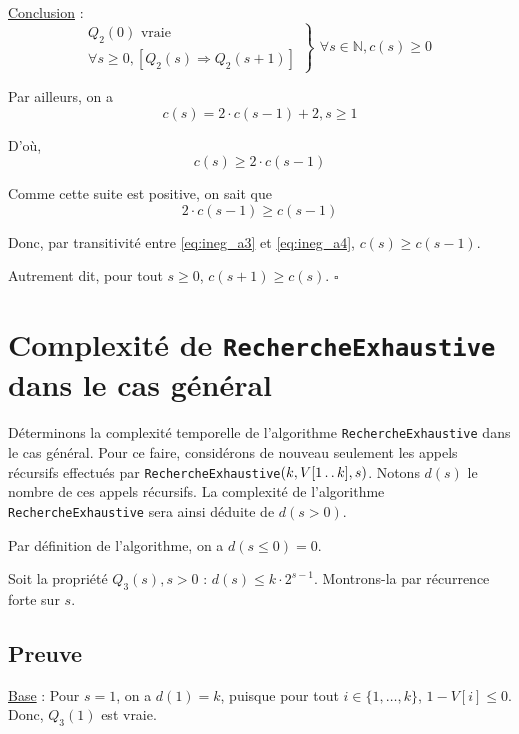 \documentclass[12pt,a4paper]{article}
\newcommand{\tdots}{\mathinner {\ldotp \ldotp}}
\begin{document}
\begin{appendices}
\medskip
\underline{Conclusion} : 
\begin{equation*}
\left .\begin{array}{l}
Q_{2}(0) \text{ vraie } \\
\forall s \geq 0, [Q_{2}(s) \Rightarrow Q_{2}(s+1) ]
\end{array} \right \}
\left .\begin{array}{l}
\forall s \in \mathbb{N}, c(s) \geq 0
\end{array}\right .
\end{equation*}

\bigskip
Par ailleurs, on a 
\begin{equation*}
   c(s) = 2\cdot c(s-1) + 2, s \geq 1
\end{equation*}

D'o\`u,
\begin{equation}
   c(s) \geq 2\cdot c(s-1) \label{eq:ineg_a3}
\end{equation}

Comme cette suite est positive, on sait que 
\begin{equation}
   2\cdot c(s-1) \geq c(s-1) \label{eq:ineg_a4}
\end{equation}

Donc, par transitivit\'e entre \eqref{eq:ineg_a3} et \eqref{eq:ineg_a4}, $c(s) \geq c(s-1)$.

Autrement dit, pour tout $s \geq 0$, $c(s+1) \geq c(s)$. \hfill\ensuremath{\square}

\newpage
\section{Complexit\'e de \texttt{RechercheExhaustive} dans le cas g\'en\'eral}
\label{appendix:rech_gen}
D\'eterminons la complexit\'e temporelle de l'algorithme \texttt{RechercheExhaustive} dans le cas g\'en\'eral. Pour ce faire, consid\'erons de nouveau seulement les appels r\'ecursifs effectu\'es par \texttt{RechercheExhaustive}$(k,V[1 \tdots k],s)$. Notons $d(s)$ le nombre de ces appels r\'ecursifs. La complexit\'e de l'algorithme \texttt{RechercheExhaustive} sera ainsi d\'eduite de $d(s > 0)$.

Par d\'efinition de l'algorithme, on a $d(s \leq 0) = 0$.

Soit la propri\'et\'e $Q_3(s), s > 0 $ : $d(s) \leq k\cdot 2^{s-1}$.
Montrons-la par r\'ecurrence forte sur $s$.

\subsection*{Preuve}
\underline{Base} : Pour \( s = 1\), on a $d(1) = k$, puisque pour tout $i \in \{1, \dotsc, k \}$, $1 - V[i] \leq 0$. Donc, $Q_{3}(1)$ est vraie.


\end{appendices}
\end{document}
